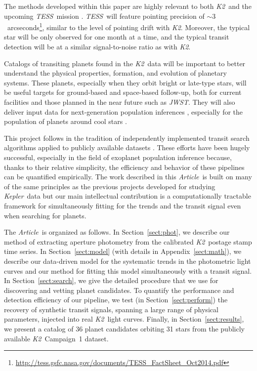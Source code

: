 \documentclass[12pt,preprint]{aastex}
\newcommand{\project}[1]{\textsl{#1}} %
\newcommand{\kepler}{\project{Kepler}}
\newcommand{\KT}{\project{K2}}
\newcommand{\tess}{\project{TESS}}
\newcommand{\jwst}{\project{JWST}}
\newcommand{\paper}{\textsl{Article}}
\newcommand{\sectionname}{Section}
\newcommand{\Sect}[1]{\sectionname~\ref{sect:#1}}
\newcommand{\sect}[1]{\Sect{#1}}
\newcommand{\App}[1]{Appendix~\ref{sect:#1}}
\newcommand{\app}[1]{\App{#1}}
\begin{document}
The methods developed within this paper are highly relevant to both \KT\ and
the upcoming \tess\ mission \citep{Ricker:2014}.
\tess\ will feature pointing precision of $\sim
3$~arcseconds\footnote{\url{http://tess.gsfc.nasa.gov/documents/TESS_FactSheet_Oct2014.pdf}},
similar to the level of pointing drift with \KT.
Moreover, the typical star will be only observed for one month at a time, and
the typical transit detection will be at a similar signal-to-noise ratio as
with \KT.

Catalogs of transiting planets found in the \KT\ data will be important to
better understand the physical properties, formation, and evolution of
planetary systems.
These planets, especially when they orbit bright or late-type stars, will be
useful targets for ground-based and space-based follow-up, both for current
facilities and those planned in the near future such as \jwst.
They will also deliver input data for next-generation population inferences
\citep{Foreman-Mackey:2014}, especially for the population of planets around
cool stars \citep[for example,][]{Dressing:2015}.

This project follows in the tradition of independently implemented transit
search algorithms applied to publicly available datasets \citep[such
as][]{Petigura:2013a, Petigura:2013, Sanchis-Ojeda:2014, Dressing:2015}.
These efforts have been hugely successful, especially in the field of
exoplanet population inference because, thanks to their relative simplicity,
the efficiency and behavior of these pipelines can be quantified empirically.
The work described in this \paper\ is built on many of the same principles as
the previous projects developed for studying \kepler\ data but our main
intellectual contribution is a computationally tractable framework for
simultaneously fitting for the trends and the transit signal even when
searching for planets.

The \paper\ is organized as follows.
In \sect{phot}, we describe our method of extracting aperture photometry from
the calibrated \KT\ postage stamp time series.
In \sect{model} (with details in \app{math}), we describe our data-driven
model for the systematic trends in the photometric light curves and our method
for fitting this model simultaneously with a transit signal.
In \sect{search}, we give the detailed procedure that we use for discovering
and vetting planet candidates.
To quantify the performance and detection efficiency of our pipeline, we test
(in \sect{perform}) the recovery of synthetic transit
signals, spanning a large range of physical parameters, injected into real
\KT\ light curves.
Finally, in \sect{results}, we present a catalog of 36 planet candidates
orbiting 31 stars from the publicly available \KT\ Campaign~1 dataset.
\end{document}
